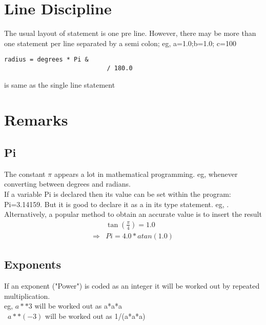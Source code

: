 \documentclass[class=book,crop=false]{standalone}
\begin{document}
    \section{Line Discipline} 
    The usual layout of statement is one pre line. However, there may be more than one statement per line separated by a semi colon; eg, a=1.0;b=1.0; c=100\\
    \begin{lstlisting}[numbers=none]
        radius = degrees * Pi &
                            / 180.0
    \end{lstlisting}
    is same as the single line statement 
    \section{Remarks}
    \subsection{Pi}
    The constant $ \pi $ appears a lot in mathematical programming. eg, whenever converting between degrees and radians.\\
    If a  variable Pi is declared then its value can be set within the program: Pi=3.14159. But it is good to declare it as a  in its type statement. eg, . Alternatively, a popular method to obtain an accurate value is to insert the result
    \begin{align*}
        & \tan(\frac{\pi}{4})=1.0 \\
        \Rightarrow & Pi=4.0* atan(1.0)
    \end{align*}
    \subsection{Exponents} 
    If an exponent ("Power") is coded as an integer it will be worked out by repeated multiplication.\\eg,
    $ a**3 $ will be worked out as a*a*a\\
    $ \,\,\,  a**(-3)$ will be worked out as 1/(a*a*a)\\
\end{document}
